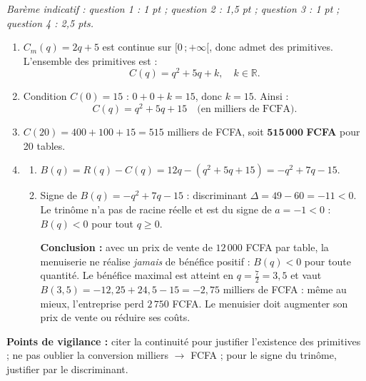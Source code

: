 \documentclass[11pt]{article}
\begin{document}
\begin{corrige}
\emph{Barème indicatif : question 1 : 1 pt ; question 2 : 1,5 pt ; question 3 : 1 pt ; question 4 : 2,5 pts.}
\begin{enumerate}
\item $C_m(q) = 2q + 5$ est continue sur $[0\,;+\infty[$, donc admet des primitives. L'ensemble des primitives est :
\[
C(q) = q^2 + 5q + k, \quad k \in \mathbb{R}.
\]
\item Condition $C(0) = 15$ : $0 + 0 + k = 15$, donc $k = 15$. Ainsi :
\[
C(q) = q^2 + 5q + 15 \quad \text{(en milliers de FCFA)}.
\]
\item $C(20) = 400 + 100 + 15 = 515$ milliers de FCFA, soit $\mathbf{515\,000}$ \textbf{FCFA} pour 20 tables.
\item \begin{enumerate}
\item $B(q) = R(q) - C(q) = 12q - (q^2 + 5q + 15) = -q^2 + 7q - 15$.
\item Signe de $B(q) = -q^2 + 7q - 15$ : discriminant $\Delta = 49 - 60 = -11 < 0$. Le trinôme n'a pas de racine réelle et est du signe de $a = -1 < 0$ : $B(q) < 0$ pour tout $q \geq 0$.

\textbf{Conclusion :} avec un prix de vente de $12\,000$ FCFA par table, la menuiserie ne réalise \emph{jamais} de bénéfice positif : $B(q) < 0$ pour toute quantité. Le bénéfice maximal est atteint en $q = \tfrac{7}{2} = 3{,}5$ et vaut $B(3{,}5) = -12{,}25 + 24{,}5 - 15 = -2{,}75$ milliers de FCFA : même au mieux, l'entreprise perd $2\,750$ FCFA. Le menuisier doit augmenter son prix de vente ou réduire ses coûts.
\end{enumerate}
\end{enumerate}
\textbf{Points de vigilance :} citer la continuité pour justifier l'existence des primitives ; ne pas oublier la conversion milliers $\to$ FCFA ; pour le signe du trinôme, justifier par le discriminant.
\end{corrige}
\end{document}
